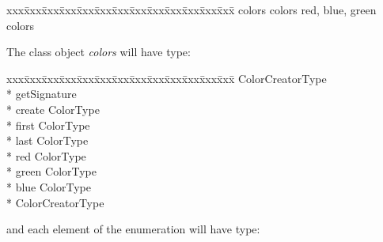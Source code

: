 {\small\it\begin{minipage}{\textwidth}\begin{tabbing}
xxx\=xxx\=xxx\=xxx\=xxx\=xxx\=xxx\=xxx\=xxx\=xxx\=xxx\=xxx\=xxx\=\+\kill%
 colors \assign{}  colors red, blue, green  colors
\end{tabbing}\end{minipage}}

The class object {\it colors\/} will have type:

{\small\it\begin{minipage}{\textwidth}\begin{tabbing}
xxx\=xxx\=xxx\=xxx\=xxx\=xxx\=xxx\=xxx\=xxx\=xxx\=xxx\=xxx\=xxx\=\+\kill%
  ColorCreatorType\+\\*{}%
    getSignature \returns{} \/\LB{}\/\RB{}\\*{}%
   create\/\LB{}\/\RB{} \returns{} \/\LB{}ColorType\/\RB{}\\*{}%
   first \returns{} \/\LB{}ColorType\/\RB{}\\*{}%
   last \returns{} \/\LB{}ColorType\/\RB{}\\*{}%
   red \returns{} \/\LB{}ColorType\/\RB{}\\*{}%
   green \returns{} \/\LB{}ColorType\/\RB{}\\*{}%
   blue \returns{} \/\LB{}ColorType\/\RB{}\-\\*{}%
 ColorCreatorType
\end{tabbing}\end{minipage}}

and each element of the enumeration will have type:

